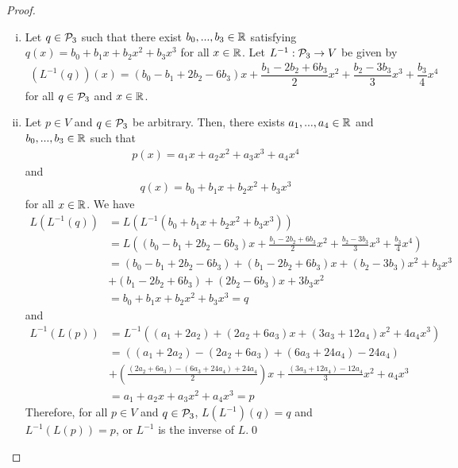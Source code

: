 \begin{proof}
\begin{enumerate}[(i)]
        \item Let $q\in\P_3$ such that there exist $b_0,...,b_3\in\R$ satisfying $q(x)=b_0+b_1x+b_2x^2+b_3x^3$ for all $x\in\R$. Let $L^{-1}:\P_3\rightarrow V$ be given by 
        \[
            \begin{aligned}
                (L^{-1}(q))(x)=(b_0-b_1+2b_2-6b_3)x+\dfrac{b_1-2b_2+6b_3}{2}x^2+\dfrac{b_2-3b_3}{3}x^3+\dfrac{b_3}{4}x^4
            \end{aligned}
        \]
        for all $q\in\P_3$ and $x\in\R$.
        \item Let $p\in V$ and $q\in\P_3$ be arbitrary.
        Then, there exists $a_1,...,a_4\in\R$ and $b_0,...,b_3\in\R$ such that 
        \[
            \begin{aligned}
                p(x)=a_1x+a_2x^2+a_3x^3+a_4x^4
            \end{aligned}
        \]
        and 
        \[
            \begin{aligned}
                q(x)=b_0+b_1x+b_2x^2+b_3x^3
            \end{aligned}
        \]
        for all $x\in\R$.
        We have 
        \[
            \begin{aligned}
                L(L^{-1}(q))&=L(L^{-1}(b_0+b_1x+b_2x^2+b_3x^3))\\
                &= L((b_0-b_1+2b_2-6b_3)x+\frac{b_1-2b_2+6b_3}{2}x^2+\frac{b_2-3b_3}{3}x^3+\frac{b_3}{4}x^4)\\
                &= (b_0-b_1+2b_2-6b_3)+(b_1-2b_2+6b_3)x+(b_2-3b_3)x^2+b_3x^3\\
                &+(b_1-2b_2+6b_3)+(2b_2-6b_3)x+3b_3x^2\\
                &= b_0+b_1x+b_2x^2+b_3x^3=q
            \end{aligned}
        \]
        and 
        \[
            \begin{aligned}
                L^{-1}(L(p))&=L^{-1}((a_1+2a_2)+(2a_2+6a_3)x+(3a_3+12a_4)x^2+4a_4x^3)\\
                &=((a_1+2a_2)-(2a_2+6a_3)+(6a_3+24a_4)-24a_4)\\
                &+(\frac{(2a_2+6a_3)-(6a_3+24a_4)+24a_4}{2})x+\frac{(3a_3+12a_4)-12a_4}{3}x^2+a_4x^3\\
                &= a_1+a_2x+a_3x^2+a_4x^3=p
            \end{aligned}
        \]
        Therefore, for all $p\in V$ and $q\in\P_3$, $L(L^{-1})(q)=q$ and $L^{-1}(L(p))=p$, or $L^{-1}$ is the inverse of $L$.\qed
    \end{enumerate}
    \renewcommand{\qedsymbol}{}
\end{proof}
